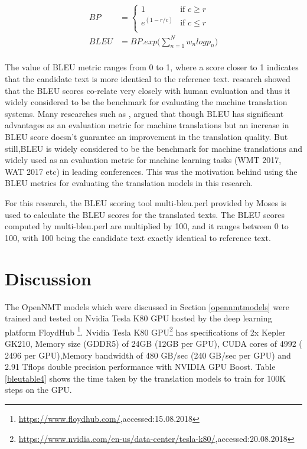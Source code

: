 \begin{align*}
    BP &= \begin{cases}
  1 & \text{if } c \ge r\\    
  e^(1-r/c) & \text{if } c\leq r\\    
   \end{cases} 
   \\
BLEU &= BP.exp \Bigg(\sum_{n=1}^N w_n logp_n\Bigg) \\
\end{align*}

The value of BLEU metric ranges from 0 to 1, where a score closer to 1 indicates that the candidate text is more identical to the reference text. \cite{Papineni:2002:BMA:1073083.1073135} research showed that the BLEU scores co-relate very closely with human evaluation and thus it widely considered to be the benchmark for evaluating the machine translation systems. Many researches such as \cite{Callison-Burch06re-evaluatingthe}, \cite{unknown} argued that though BLEU has significant advantages as an evaluation metric for machine translations but an increase in BLEU score doesn't guarantee an improvement in the translation quality. But still,BLEU is widely considered to be the benchmark for machine translations and widely used as an evaluation metric for machine learning tasks (WMT 2017, WAT 2017 etc) in leading conferences. This was the motivation behind using the BLEU metrics for evaluating the translation models in this research. 

For this research, the BLEU scoring tool multi-bleu.perl provided by Moses is used to calculate the BLEU scores for the translated texts. The BLEU scores computed by multi-bleu.perl are multiplied by 100, and it ranges between 0 to 100, with 100 being the candidate text exactly identical to reference text.

\section{Discussion}

The OpenNMT models which were discussed in Section \ref{opennmtmodels} were trained and tested on Nvidia Tesla K80 GPU hosted by the deep learning platform FloydHub \footnote{\url{https://www.floydhub.com/},accessed:15.08.2018}. Nvidia Tesla K80 GPU\footnote{{\url{https://www.nvidia.com/en-us/data-center/tesla-k80/},accessed:20.08.2018}} has specifications of 2x Kepler GK210, Memory size (GDDR5) of 24GB (12GB per GPU), CUDA cores of 4992 ( 2496 per GPU),Memory bandwidth of 480 GB/sec (240 GB/sec per GPU)
and 2.91 Tflops double precision performance with NVIDIA GPU Boost. Table \ref{bleutable4} shows the time taken by the translation models to train for 100K steps on the GPU.

